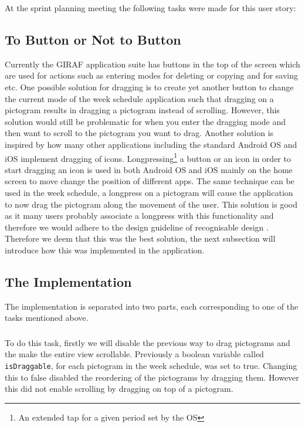\bigskip \noindent
At the sprint planning meeting the following tasks were made for this user story:
\begin{enumberate}
	\item {}
	\item {}
\end{enumberate}

\subsection*{To Button or Not to Button} %
Currently the GIRAF application suite has buttons in the top of the screen which are used for actions such as entering modes for deleting or copying and for saving etc. 
One possible solution for dragging is to create yet another button to change the current mode of the week schedule application such that dragging on a pictogram results in dragging a pictogram instead of scrolling.
However, this solution would still be problematic for when you enter the dragging mode and then want to scroll to the pictogram you want to drag.
Another solution is inspired by how many other applications including the standard Android OS and iOS implement dragging of icons.
Longpressing\footnote{An extended tap for a given period set by the OS} a button or an icon in order to start dragging an icon is used in both Android OS and iOS mainly on the home screen to move change the position of different apps.
The same technique can be used in the week schedule, a longpress on a pictogram will cause the application to now drag the pictogram along the movement of the user.
This solution is good as it many users probably associate a longpress with this functionality and therefore we would adhere to the design guideline of recognisable design \cite[p.~51]{DESIGNBOOK}.
Therefore we deem that this was the best solution, the next subsection will introduce how this was implemented in the application.

\subsection*{The Implementation}
The implementation is separated into two parts, each corresponding to one of the tasks mentioned above. 
\subsubsection*{}
To do this task, firstly we will disable the previous way to drag pictograms and the make the entire view scrollable. 
Previously a boolean variable called \texttt{isDraggable}, for each pictogram in the week schedule, was set to true. 
Changing this to false disabled the reordering of the pictograms by dragging them. 
However this did not enable scrolling by dragging on top of a pictogram. 

